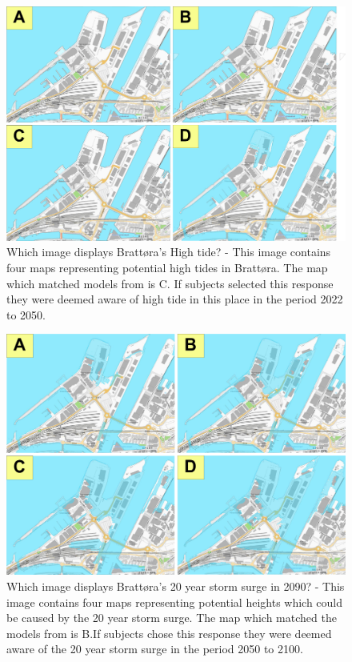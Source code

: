 \begin{figure} [H]
    \centering
    \includegraphics[width=16cm]{fig/brattora question on 2022 high tide quadrant.png}
    \caption{Which image displays Brattøra's High tide? -  This image contains four maps representing potential high tides in Brattøra. The map which matched models from \cite{kartverket_se_2021} is C. If subjects selected this response they were deemed aware of high tide in this place in the period 2022 to 2050. }
    \label{fig:brattora_2022_hightide}
\end{figure}

\begin{figure}[H]
    \centering
    \includegraphics[width=16cm]{fig/brattora question on 2090 20 yr storm surge quadrant.png} 
    \caption{Which image displays Brattøra's 20 year storm surge in 2090? - This image contains four maps representing potential heights which could be caused by the 20 year storm surge. The map which matched the models from \cite{kartverket_se_2021} is B.If subjects chose this response they were deemed aware of the 20 year storm surge in the period 2050 to 2100. }
    \label{fig:brattora_2090_stormsurge}
\end{figure}

